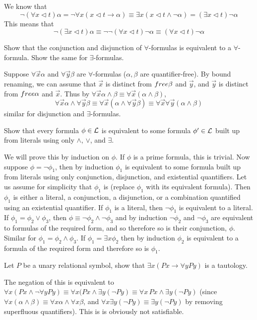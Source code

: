\eexerc

We know that
$$ \neg(\forall x\triangleleft t)\alpha = \neg\forall x(x\triangleleft t\to\alpha) \equiv \exists x(x\triangleleft t\land\neg\alpha) = (\exists x\triangleleft t)\neg\alpha $$
This means that
$$ \neg(\exists x\triangleleft t)\alpha \equiv \neg\neg(\forall x\triangleleft t)\neg\alpha \equiv (\forall x\triangleleft t)\neg\alpha $$

\bexerc

    Show that the conjunction and disjunction of $\forall$-formulas is equivalent to a $\forall$-formula.
    Show the same for $\exists$-formulas.

\eexerc

Suppose $\forall\vec x\alpha$ and $\forall\vec y\beta$ are $\forall$-formulas ($\alpha,\beta$ are quantifier-free).
By bound renaming, we can assume that $\vec x$ is distinct from ${\sl free}\beta$ and $\vec y$, and $\vec y$ is distinct from ${\sl free}\alpha$ and $\vec x$.
Thus by $\forall\vec x\alpha\land\beta\equiv\forall\vec x(\alpha\land\beta)$,
$$ \forall\vec x\alpha\land\forall\vec y\beta \equiv \forall\vec x(\alpha\land\forall\vec y\beta) \equiv \forall\vec x\forall\vec y(\alpha\land\beta) $$
similar for disjunction and $\exists$-formulas.

\bexerc

    Show that every formula $\phi\in{\cal L}$ is equivalent to some formula $\phi'\in{\cal L}$ built up from literals using only $\land$, $\lor$, and $\exists$.

\eexerc

We will prove this by induction on $\phi$.
If $\phi$ is a prime formula, this is trivial.
Now suppose $\phi=\neg\phi_1$, then by induction $\phi_1$ is equivalent to some formula built up from literals using only conjunction, disjunction, and existential quantifiers.
Let us assume for simplicity that $\phi_1$ is (replace $\phi_1$ with its equivalent formula).
Then $\phi_1$ is either a literal, a conjunction, a disjunction, or a combination quantified using an existential quantifier.
If $\phi_1$ is a literal, then $\neg\phi_1$ is equivalent to a literal.
If $\phi_1=\phi_2\lor\phi_3$, then $\phi\equiv\neg\phi_2\land\neg\phi_3$ and by induction $\neg\phi_2$ and $\neg\phi_3$ are equivalent to formulas of the required form, and so therefore so is their
conjunction, $\phi$.
Similar for $\phi_1=\phi_2\land\phi_3$.
If $\phi_1=\exists x\phi_2$ then by induction $\phi_2$ is equivalent to a formula of the required form and therefore so is $\phi_1$.

\bexerc

    Let $P$ be a unary relational symbol, show that $\exists x(Px\to\forall yPy)$ is a tautology.

\eexerc

The negation of this is equivalent to $\forall x(Px\land\neg\forall yPy)\equiv\forall x(Px\land\exists y(\neg Py)\equiv\forall x\,Px\land\exists y(\neg Py)$ (since
$\forall x(\alpha\land\beta)\equiv\forall x\alpha\land\forall x\beta$, and $\forall x\exists y(\neg Py)\equiv\exists y(\neg Py)$ by removing superfluous quantifiers).
This is is obviously not satisfiable.

